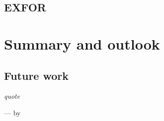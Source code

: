 \documentclass[twoside,english]{uiofysmaster/uiofysmaster}
\begin{document}
\section{EXFOR}
\label{sec: exfor}






\chapter{Summary and outlook}
\label{sum_and_outlook}
\section{Future work}
\label{sec: future_work}


\epigraph{\itshape quote}{--- \textup by }








%

%

%


\end{document}
